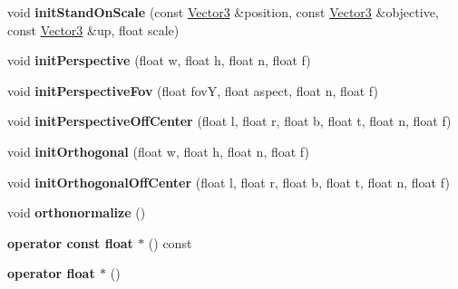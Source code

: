 \begin{DoxyCompactItemize}
\item 
void {\bfseries init\+Stand\+On\+Scale} (const \hyperlink{class_magnum_1_1_vector3}{Vector3} \&position, const \hyperlink{class_magnum_1_1_vector3}{Vector3} \&objective, const \hyperlink{class_magnum_1_1_vector3}{Vector3} \&up, float scale)\hypertarget{class_magnum_1_1_matrix4_ad0db72aeef56e1da5cab10ec8bc94274}{}\label{class_magnum_1_1_matrix4_ad0db72aeef56e1da5cab10ec8bc94274}

\item 
void {\bfseries init\+Perspective} (float w, float h, float n, float f)\hypertarget{class_magnum_1_1_matrix4_a76f94c959ebcbc421711c26746540ed3}{}\label{class_magnum_1_1_matrix4_a76f94c959ebcbc421711c26746540ed3}

\item 
void {\bfseries init\+Perspective\+Fov} (float fovY, float aspect, float n, float f)\hypertarget{class_magnum_1_1_matrix4_a23af89991107c39bfd587e920dd288ed}{}\label{class_magnum_1_1_matrix4_a23af89991107c39bfd587e920dd288ed}

\item 
void {\bfseries init\+Perspective\+Off\+Center} (float l, float r, float b, float t, float n, float f)\hypertarget{class_magnum_1_1_matrix4_ae3372ce8c2e9085d9268e6b210f101da}{}\label{class_magnum_1_1_matrix4_ae3372ce8c2e9085d9268e6b210f101da}

\item 
void {\bfseries init\+Orthogonal} (float w, float h, float n, float f)\hypertarget{class_magnum_1_1_matrix4_af9e39fd6de51edc9b7dc678d9e7572a1}{}\label{class_magnum_1_1_matrix4_af9e39fd6de51edc9b7dc678d9e7572a1}

\item 
void {\bfseries init\+Orthogonal\+Off\+Center} (float l, float r, float b, float t, float n, float f)\hypertarget{class_magnum_1_1_matrix4_aa7389bb46ea86c4c009b51c77e66279c}{}\label{class_magnum_1_1_matrix4_aa7389bb46ea86c4c009b51c77e66279c}

\item 
void {\bfseries orthonormalize} ()\hypertarget{class_magnum_1_1_matrix4_a9dff1a4cbaab68ab4d0ccaf5c8bf313e}{}\label{class_magnum_1_1_matrix4_a9dff1a4cbaab68ab4d0ccaf5c8bf313e}

\item 
{\bfseries operator const float $\ast$} () const \hypertarget{class_magnum_1_1_matrix4_ab21fc1e54677109e5b25e530fdac2b83}{}\label{class_magnum_1_1_matrix4_ab21fc1e54677109e5b25e530fdac2b83}

\item 
{\bfseries operator float $\ast$} ()\hypertarget{class_magnum_1_1_matrix4_a0ffdcf73a5b8cc15fcc7960c28e902d6}{}\label{class_magnum_1_1_matrix4_a0ffdcf73a5b8cc15fcc7960c28e902d6}


\end{DoxyCompactItemize}
